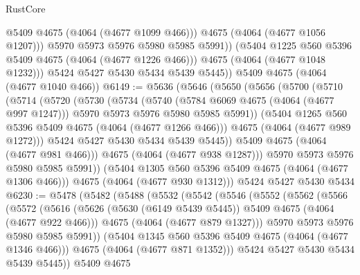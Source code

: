 \begin{lexlean}{RustCore}
\begin{coremodule}
                  @5409
                  @4675
                  (@4064 (@4677 @1099 @466)))
                @4675
                (@4064 (@4677 @1056 @1207)))
              @5970
              @5973
              @5976
              @5980
              @5985
              @5991))
          (@5404 @1225 @560 @5396 @5409 @4675 (@4064 (@4677 @1226 @466)))
          @4675
          (@4064 (@4677 @1048 @1232)))
        @5424
        @5427
        @5430
        @5434
        @5439
        @5445))
    @5409
    @4675
    (@4064 (@4677 @1040 @466))
@6149 := @5636
    (@5646
      (@5650
        (@5656
          (@5700
            (@5710
              (@5714
                (@5720
                  (@5730
                    (@5734
                      (@5740
                        (@5784 @6069 @4675 (@4064 (@4677 @997 @1247)))
                        @5970
                        @5973
                        @5976
                        @5980
                        @5985
                        @5991))
                    (@5404 @1265 @560 @5396 @5409 @4675 (@4064 (@4677 @1266 @466)))
                    @4675
                    (@4064 (@4677 @989 @1272)))
                  @5424
                  @5427
                  @5430
                  @5434
                  @5439
                  @5445))
              @5409
              @4675
              (@4064 (@4677 @981 @466)))
            @4675
            (@4064 (@4677 @938 @1287)))
          @5970
          @5973
          @5976
          @5980
          @5985
          @5991))
      (@5404 @1305 @560 @5396 @5409 @4675 (@4064 (@4677 @1306 @466)))
      @4675
      (@4064 (@4677 @930 @1312)))
    @5424
    @5427
    @5430
    @5434
@6230 := @5478
    (@5482
      (@5488
        (@5532
          (@5542
            (@5546
              (@5552
                (@5562
                  (@5566
                    (@5572
                      (@5616
                        (@5626 (@5630 (@6149 @5439 @5445)) @5409 @4675 (@4064 (@4677 @922 @466)))
                        @4675
                        (@4064 (@4677 @879 @1327)))
                      @5970
                      @5973
                      @5976
                      @5980
                      @5985
                      @5991))
                  (@5404 @1345 @560 @5396 @5409 @4675 (@4064 (@4677 @1346 @466)))
                  @4675
                  (@4064 (@4677 @871 @1352)))
                @5424
                @5427
                @5430
                @5434
                @5439
                @5445))
            @5409
            @4675

\end{coremodule}
\end{lexlean}
